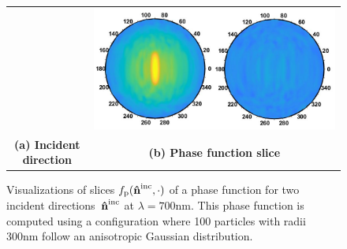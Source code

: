 \begin{figure}[t]
\begin{tabular}{ccc}
        & \multicolumn{2}{c}{\includegraphics[height=\resLen]{images/pfunc/aniso_y.png}}
        \\
        \textbf{(a) Incident direction} & \multicolumn{2}{c}{\textbf{(b) Phase function slice}}
    \end{tabular}
    \caption{\label{fig:aniso1}
        Visualizations of slices $f_\mathrm{p}(\mathbf{\hat{n}}^{\text{inc}},\cdot)$ of a phase function for two incident directions~$\mathbf{\hat{n}}^{\text{inc}}$ at $\lambda = 700\text{nm}$.
        This phase function is computed using a configuration where 100 particles with radii 300nm follow an anisotropic Gaussian distribution.
    }
\end{figure}
